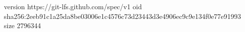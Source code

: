 version https://git-lfs.github.com/spec/v1
oid sha256:2eeb91c1a25da8be03006e1c4576c73d23443d3e4906ec9c9e134f0e77e91993
size 2796344
